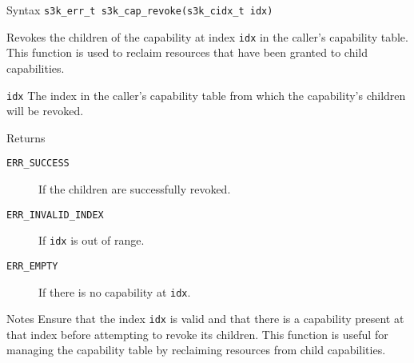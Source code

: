 \documentclass[a4paper,11pt]{article}
\newcommand{\syscall}[1]{\texttt{#1}}
\newenvironment{syscalldoc}[1]{
  \begin{tcolorbox}[breakable,title=\subsection{\syscall{#1}}]
  \begin{description}[leftmargin=!,style=nextline,noitemsep]
}{
  \end{description}
  \end{tcolorbox}
}
\begin{document}
\begin{syscalldoc}{s3k\_cap\_revoke}
  \item[Syntax] \lstinline{s3k_err_t s3k_cap_revoke(s3k_cidx_t idx)}

  \item[Description] Revokes the children of the capability at index \verb|idx| in the caller's capability table. This function is used to reclaim resources that have been granted to child capabilities.

  \item[Parameters]
    \begin{description}
      \item[]
      \item[\texttt{idx}] The index in the caller's capability table from which the capability's children will be revoked.
    \end{description}

  \item[Returns]
    \begin{description}
      \item[]
      \item[\texttt{ERR\_SUCCESS}] If the children are successfully revoked.
      \item[\texttt{ERR\_INVALID\_INDEX}] If \verb|idx| is out of range.
      \item[\texttt{ERR\_EMPTY}] If there is no capability at \verb|idx|.
    \end{description}

  \item[Notes] Ensure that the index \verb|idx| is valid and that there is a capability present at that index before attempting to revoke its children. This function is useful for managing the capability table by reclaiming resources from child capabilities.
\end{syscalldoc}
\end{document}
